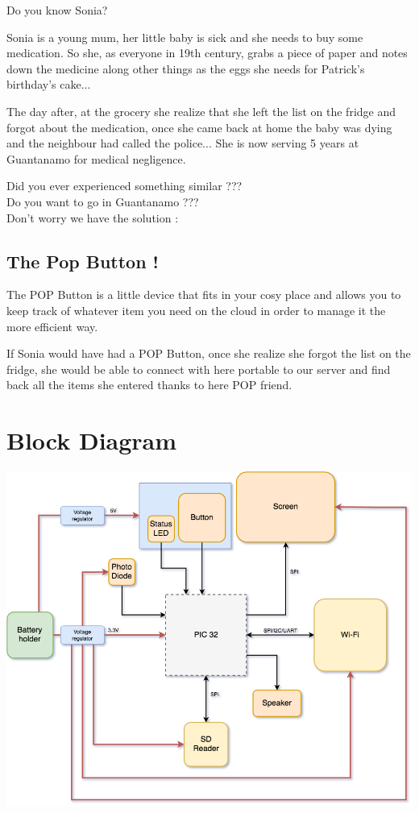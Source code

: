 \documentclass[12pt,a4paper,landscape]{article}
\begin{document}
	\begin{multicols}{2}
	Do you know Sonia?
	
	Sonia is a young mum, her little baby is sick and she needs to buy some medication.
	So she, as everyone in 19th century, grabs a piece of paper and notes down the medicine along other things as the eggs she needs for Patrick's birthday's cake...
	
	The day after, at the grocery she realize that she left the list on the fridge and forgot about the medication, once she came back at home the baby was dying and the neighbour had called the police... She is now serving 5 years at Guantanamo for medical negligence.
	
	Did you ever experienced something similar ???\\
	Do you want to go in Guantanamo ???\\
	
	Don't worry we have the solution :
	
	\subsection*{\centering The Pop Button !}
	
	The POP Button is a little device that fits in your cosy place and allows you to keep track of whatever item you need on the cloud in order to manage it the more efficient way.
	
	If Sonia would have had a POP Button, once she realize she forgot the list on the fridge, she would be able to connect with here portable to our server and find back all the items she entered thanks to here POP friend.
	
	\end{multicols}
	
\section*{Block Diagram}
	\includegraphics[width=19cm]{block-diagram.png}
\end{document}
